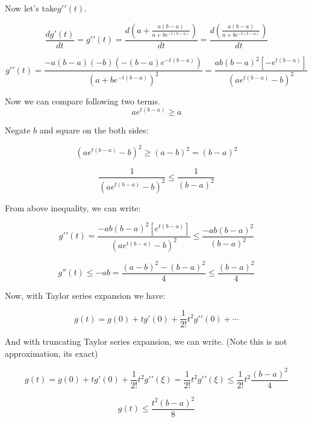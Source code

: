 \documentclass[
]{article}
\begin{document}
Now let's take\({{g}'}'\left( t \right)\).

\[\frac{d{g}'\left( t \right)}{dt}={{g}'}'\left( t \right)=\frac{d\left( a+\frac{a\left( b-a \right)}{a+b{{e}^{-t\left( b-a \right)}}} \right)}{dt}=\frac{d\left( \frac{a\left( b-a \right)}{a+b{{e}^{-t\left( b-a \right)}}} \right)}{dt}\]

\[{{g}'}'\left( t \right)=\frac{-a\left( b-a \right)\left( -b \right)\left( -\left( b-a \right){{e}^{-t\left( b-a \right)}} \right)}{{{\left( a+b{{e}^{-t\left( b-a \right)}} \right)}^{2}}}=\frac{ab{{\left( b-a \right)}^{2}}\left[ -{{e}^{t\left( b-a \right)}} \right]}{{{\left( a{{e}^{t\left( b-a \right)}}-b \right)}^{2}}}\]

Now we can compare following two terms.
\[a{{e}^{t\left( b-a \right)}}\ge a\]

Negate \(b\) and square on the both sides:

\[{{\left( a{{e}^{t\left( b-a \right)}}-b \right)}^{2}}\ge {{\left( a-b \right)}^{2}}={{\left( b-a \right)}^{2}}\]

\[\frac{1}{{{\left( a{{e}^{t\left( b-a \right)}}-b \right)}^{2}}}\le \frac{1}{{{\left( b-a \right)}^{2}}}\]

From above inequality, we can write:

\[{{g}'}'\left( t \right)=\frac{-ab{{\left( b-a \right)}^{2}}\left[ {{e}^{t\left( b-a \right)}} \right]}{{{\left( a{{e}^{t\left( b-a \right)}}-b \right)}^{2}}}\le \frac{-ab{{\left( b-a \right)}^{2}}}{{{\left( b-a \right)}^{2}}}\]

\begin{equation}
{g}''\left( t \right)\le -ab=\frac{{{\left( a-b \right)}^{2}}-{{\left( b-a \right)}^{2}}}{4}\le \frac{{{\left( b-a \right)}^{2}}}{4}
\end{equation}

Now, with Taylor series expansion we have:

\[g\left( t \right)=g\left( 0 \right)+t{g}'\left( 0 \right)+\frac{1}{2!}{{t}^{2}}{{g}'}'\left( 0 \right)+\cdots\]

And with truncating Taylor series expansion, we can write. (Note this is
not approximation, its exact)

\[g\left( t \right)=g\left( 0 \right)+t{g}'\left( 0 \right)+\frac{1}{2!}{{t}^{2}}{{g}'}'\left( \xi  \right)=\frac{1}{2!}{{t}^{2}}{{g}'}'\left( \xi  \right)\le \frac{1}{2!}{{t}^{2}}\frac{{{\left( b-a \right)}^{2}}}{4}\]

\begin{equation}
g\left( t \right)\le \frac{{{t}^{2}}{{\left( b-a \right)}^{2}}}{8}
\end{equation}
\end{document}

